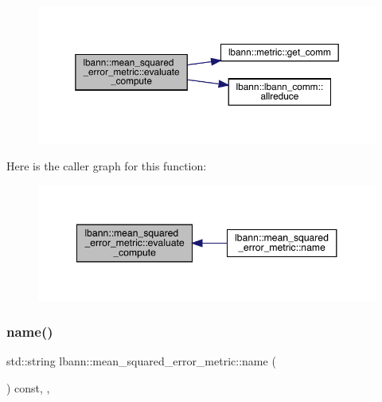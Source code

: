 \begin{figure}[H]
\begin{center}
\leavevmode
\includegraphics[width=350pt]{classlbann_1_1mean__squared__error__metric_a81a2aa469f965d526a489214b3e73e4f_cgraph}
\end{center}
\end{figure}
Here is the caller graph for this function\+:\nopagebreak
\begin{figure}[H]
\begin{center}
\leavevmode
\includegraphics[width=348pt]{classlbann_1_1mean__squared__error__metric_a81a2aa469f965d526a489214b3e73e4f_icgraph}
\end{center}
\end{figure}
\mbox{\label{classlbann_1_1mean__squared__error__metric_ac5477e6104eaf87fbbe2a13232ee2d9f}} 
\subsubsection{\texorpdfstring{name()}{name()}}
{\footnotesize\ttfamily std\+::string lbann\+::mean\+\_\+squared\+\_\+error\+\_\+metric\+::name (\begin{DoxyParamCaption}{ }\end{DoxyParamCaption}) const\hspace{0.3cm}{\ttfamily [inline]}, {\ttfamily [override]}, {\ttfamily [virtual]}}

